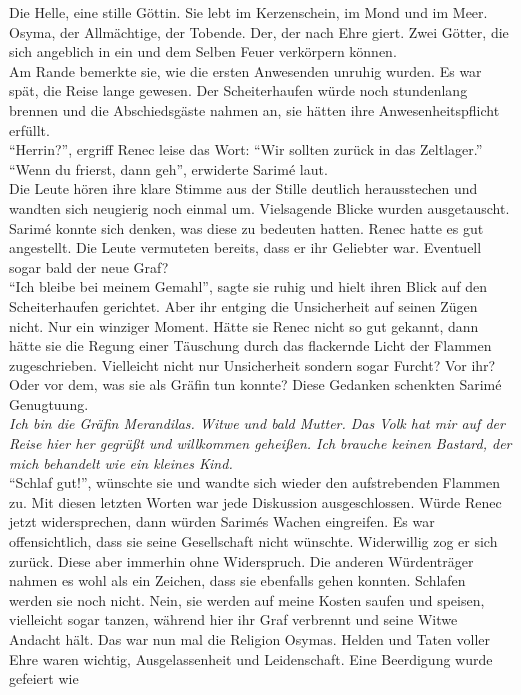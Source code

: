 Die Helle, eine stille Göttin. Sie lebt im Kerzenschein, im Mond und im Meer.  Osyma, der 
Allmächtige, der Tobende. Der, der nach Ehre giert. Zwei Götter, die sich angeblich in ein und dem 
Selben Feuer verkörpern können.\\
Am Rande bemerkte sie, wie die ersten Anwesenden unruhig wurden. Es war spät, die Reise lange 
gewesen. Der Scheiterhaufen würde noch stundenlang brennen und die Abschiedsgäste nahmen an, sie 
hätten ihre Anwesenheitspflicht erfüllt. \\
``Herrin?'', ergriff Renec leise das Wort: ``Wir sollten zurück in das Zeltlager.''\\
``Wenn du frierst, dann geh'', erwiderte Sarimé laut. \\
Die Leute hören ihre klare Stimme aus der Stille deutlich herausstechen und wandten sich neugierig 
noch einmal um. Vielsagende Blicke wurden ausgetauscht. Sarimé konnte sich denken, was diese zu 
bedeuten hatten. Renec hatte es gut angestellt. Die Leute vermuteten bereits, dass er ihr Geliebter 
war. Eventuell sogar bald der neue Graf? \\
``Ich bleibe bei meinem Gemahl'', sagte sie ruhig und hielt ihren Blick auf den Scheiterhaufen 
gerichtet. Aber ihr entging die Unsicherheit auf seinen Zügen nicht. Nur ein winziger Moment. Hätte 
sie Renec nicht so gut gekannt, dann hätte sie die Regung einer Täuschung durch das flackernde 
Licht der Flammen zugeschrieben. Vielleicht nicht nur Unsicherheit sondern sogar Furcht? Vor ihr? 
Oder vor dem, was sie als Gräfin tun konnte? Diese Gedanken schenkten Sarimé Genugtuung. \\
\textit{Ich bin die Gräfin Merandilas. Witwe und bald Mutter. Das Volk hat mir auf der Reise hier 
her gegrüßt und willkommen geheißen. Ich brauche keinen Bastard, der mich behandelt wie ein kleines 
Kind.}\\
``Schlaf gut!'', wünschte sie und wandte sich wieder den aufstrebenden Flammen zu. Mit diesen 
letzten Worten war jede Diskussion ausgeschlossen. Würde Renec jetzt widersprechen, dann würden 
Sarimés Wachen eingreifen. Es war offensichtlich, dass sie seine Gesellschaft nicht wünschte. 
Widerwillig zog er sich zurück. Diese aber immerhin ohne Widerspruch. Die anderen Würdenträger 
nahmen es wohl als ein Zeichen, dass sie ebenfalls gehen konnten. Schlafen werden sie noch nicht. 
Nein, sie werden auf meine Kosten saufen und speisen, vielleicht sogar tanzen, während hier ihr 
Graf verbrennt und seine Witwe Andacht hält. Das war nun mal die Religion Osymas. Helden und Taten 
voller Ehre waren wichtig, Ausgelassenheit und Leidenschaft. Eine Beerdigung wurde gefeiert wie 
